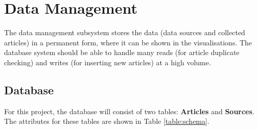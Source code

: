 \documentclass{l4proj}
\begin{document}
\section{Data Management}
The data management subsystem stores the data (data sources and collected articles) in a permanent form, where it can be shown in the visualisations. The database system should be able to handle many reads (for article duplicate checking) and writes (for inserting new articles) at a high volume. 

\subsection{Database}
For this project, the database will consist of two tables: \textbf{Articles} and \textbf{Sources}. The attributes for these tables are shown in Table \ref{table:schema}.
\end{document}
